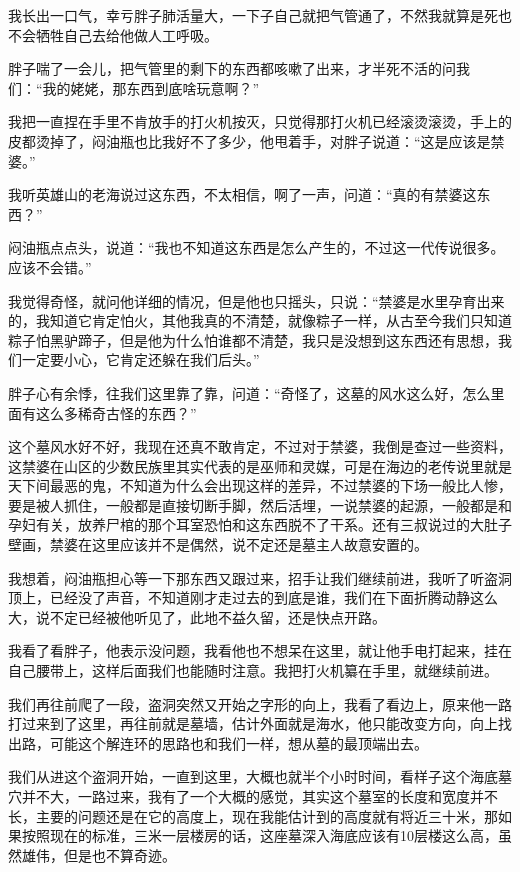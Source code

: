 我长出一口气，幸亏胖子肺活量大，一下子自己就把气管通了，不然我就算是死也不会牺牲自己去给他做人工呼吸。

胖子喘了一会儿，把气管里的剩下的东西都咳嗽了出来，才半死不活的问我们：“我的姥姥，那东西到底啥玩意啊？”

我把一直捏在手里不肯放手的打火机按灭，只觉得那打火机已经滚烫滚烫，手上的皮都烫掉了，闷油瓶也比我好不了多少，他甩着手，对胖子说道：“这是应该是禁婆。”

我听英雄山的老海说过这东西，不太相信，啊了一声，问道：“真的有禁婆这东西？”

闷油瓶点点头，说道：“我也不知道这东西是怎么产生的，不过这一代传说很多。应该不会错。”

我觉得奇怪，就问他详细的情况，但是他也只摇头，只说：“禁婆是水里孕育出来的，我知道它肯定怕火，其他我真的不清楚，就像粽子一样，从古至今我们只知道粽子怕黑驴蹄子，但是他为什么怕谁都不清楚，我只是没想到这东西还有思想，我们一定要小心，它肯定还躲在我们后头。”

胖子心有余悸，往我们这里靠了靠，问道：“奇怪了，这墓的风水这么好，怎么里面有这么多稀奇古怪的东西？”

这个墓风水好不好，我现在还真不敢肯定，不过对于禁婆，我倒是查过一些资料，这禁婆在山区的少数民族里其实代表的是巫师和灵媒，可是在海边的老传说里就是天下间最恶的鬼，不知道为什么会出现这样的差异，不过禁婆的下场一般比人惨，要是被人抓住，一般都是直接切断手脚，然后活埋，一说禁婆的起源，一般都是和孕妇有关，放养尸棺的那个耳室恐怕和这东西脱不了干系。还有三叔说过的大肚子壁画，禁婆在这里应该并不是偶然，说不定还是墓主人故意安置的。

我想着，闷油瓶担心等一下那东西又跟过来，招手让我们继续前进，我听了听盗洞顶上，已经没了声音，不知道刚才走过去的到底是谁，我们在下面折腾动静这么大，说不定已经被他听见了，此地不益久留，还是快点开路。

我看了看胖子，他表示没问题，我看他也不想呆在这里，就让他手电打起来，挂在自己腰带上，这样后面我们也能随时注意。我把打火机纂在手里，就继续前进。

我们再往前爬了一段，盗洞突然又开始之字形的向上，我看了看边上，原来他一路打过来到了这里，再往前就是墓墙，估计外面就是海水，他只能改变方向，向上找出路，可能这个解连环的思路也和我们一样，想从墓的最顶端出去。

我们从进这个盗洞开始，一直到这里，大概也就半个小时时间，看样子这个海底墓穴并不大，一路过来，我有了一个大概的感觉，其实这个墓室的长度和宽度并不长，主要的问题还是在它的高度上，现在我能估计到的高度就有将近三十米，那如果按照现在的标准，三米一层楼房的话，这座墓深入海底应该有10层楼这么高，虽然雄伟，但是也不算奇迹。

